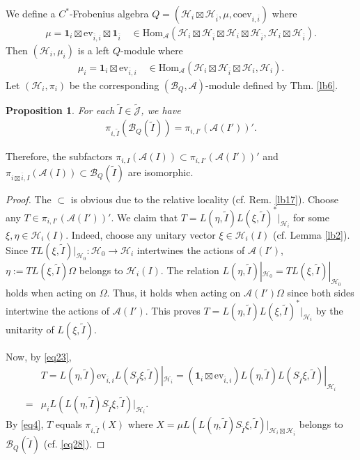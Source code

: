 \documentclass[11pt,b5paper,notitlepage]{article}
\theoremstyle{definition}
\theoremstyle{plain}
\newtheorem{pp}[df]{Proposition}
\newcommand{\mc}{\mathcal}
\newcommand{\wtd}{\widetilde}
\newcommand{\ovl}{\overline}
\newcommand{\id}{\mathbf{1}}
\newcommand{\Hom}{\mathrm{Hom}}
\newcommand{\ev}{\mathrm{ev}}
\newcommand{\coev}{\mathrm{coev}}
\newcommand{\Jtd}{\widetilde{\mathcal J}}
\numberwithin{equation}{section}
\begin{document}
We define a $C^*$-Frobenius algebra $Q=(\mc H_i\boxtimes\mc H_{\ovl i},\mu,\coev_{i,\ovl i})$ where
\begin{align*}
\mu=\id_i\boxtimes\ev_{\ovl i,i}\boxtimes\id_{\ovl i}\quad\in\Hom_{\mc A}(\mc H_i\boxtimes\mc H_{\ovl i}\boxtimes\mc H_i\boxtimes\mc H_{\ovl i},\mc H_i\boxtimes\mc H_{\ovl i}).	
\end{align*}
Then $(\mc H_i,\mu_i)$ is a left $Q$-module where
\begin{align*}
	\mu_i=\id_i\boxtimes\ev_{\ovl i,i}\quad\in\Hom_{\mc A}(\mc H_i\boxtimes\mc H_{\ovl i}\boxtimes\mc H_i,\mc H_i).	
\end{align*}
Let $(\mc H_i,\pi_i)$ be the corresponding $(\mc B_Q,\mc A)$-module defined by Thm. \ref{lb6}.


\begin{pp}
For each $\wtd I\in\Jtd$, we have
\begin{align*}
\pi_{i,\wtd I}(\mc B_Q(\wtd I))=\pi_{i,I'}(\mc A(I'))'.	
\end{align*}
\end{pp}

Therefore, the subfactors $\pi_{i,I}(\mc A(I))\subset \pi_{i,I'}(\mc A(I'))'$ and $\pi_{i\boxtimes\ovl i,I}(\mc A(I))\subset\mc B_Q(\wtd I)$ are isomorphic.

\begin{proof}
The $\subset$ is obvious due to the relative locality (cf. Rem. \ref{lb17}). Choose any $T\in \pi_{i,I'}(\mc A(I'))'$. We claim that $T=L(\eta,\wtd I)L(\xi,\wtd I)^*|_{\mc H_i}$ for some $\xi,\eta\in\mc H_i(I)$. Indeed, choose any unitary vector $\xi\in\mc H_i(I)$ (cf. Lemma \ref{lb2}). Since $TL(\xi,\wtd I)|_{\mc H_0}:\mc H_0\rightarrow\mc H_i$ intertwines the actions of $\mc A(I')$, $\eta:=TL(\xi,\wtd I)\Omega$ belongs to $\mc H_i(I)$. The relation $L(\eta,\wtd I)|_{\mc H_0}=TL(\xi,\wtd I)|_{\mc H_0}$ holds when acting on $\Omega$. Thus, it holds when acting on $\mc A(I')\Omega$ since both sides intertwine the actions of $\mc A(I')$. This proves $T=L(\eta,\wtd I)L(\xi,\wtd I)^*|_{\mc H_i}$ by the unitarity of $L(\xi,\wtd I)$. 

Now, by \eqref{eq23},
\begin{align*}
&T=L(\eta,\wtd I)\ev_{\ovl i,i}L(S_{\wtd I}\xi,\wtd I)|_{\mc H_i}=(\id_i\boxtimes \ev_{\ovl i,i})L(\eta,\wtd I)L(S_{\wtd I}\xi,\wtd I)|_{\mc H_i}\\
=&\mu_i L(L(\eta,\wtd I)S_{\wtd I}\xi,\wtd I)|_{\mc H_i}.
\end{align*}
By \eqref{eq4}, $T$ equals $\pi_{i,\wtd I}(X)$ where $X=\mu L(L(\eta,\wtd I)S_{\wtd I}\xi,\wtd I)|_{\mc H_i\boxtimes\mc H_{\ovl i}}$ belongs to $\mc B_Q(\wtd I)$ (cf. \eqref{eq28}).
\end{proof}
\end{document}
